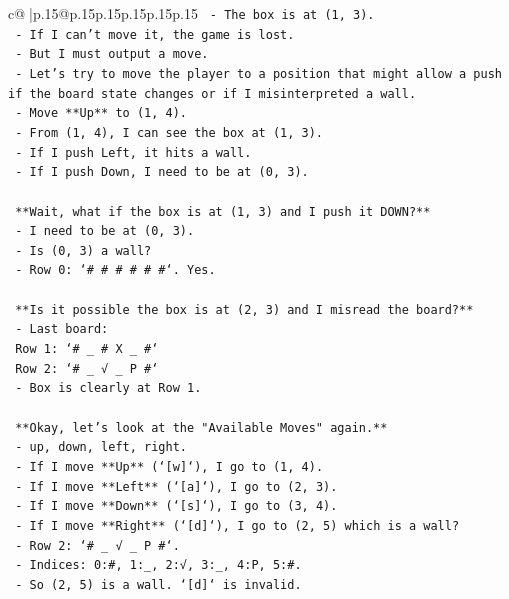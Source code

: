 \documentclass{article}
\begin{document}
{\begin{supertabular}{c@{$\;$}|p{.15\linewidth}@{}p{.15\linewidth}p{.15\linewidth}p{.15\linewidth}p{.15\linewidth}p{.15\linewidth}}
{{{\texttt{  {-} The box is at (1, 3).} \\
\texttt{  {-} If I can't move it, the game is lost.} \\
\texttt{  {-} But I must output a move.} \\
\texttt{  {-} Let's try to move the player to a position that might allow a push if the board state changes or if I misinterpreted a wall.} \\
\texttt{  {-} Move **Up** to (1, 4).} \\
\texttt{  {-} From (1, 4), I can see the box at (1, 3).} \\
\texttt{  {-} If I push Left, it hits a wall.} \\
\texttt{  {-} If I push Down, I need to be at (0, 3).} \\
\\ 
\texttt{  **Wait, what if the box is at (1, 3) and I push it DOWN?**} \\
\texttt{  {-} I need to be at (0, 3).} \\
\texttt{  {-} Is (0, 3) a wall?} \\
\texttt{  {-} Row 0: `\# \# \# \# \# \#`. Yes.} \\
\\ 
\texttt{  **Is it possible the box is at (2, 3) and I misread the board?**} \\
\texttt{  {-} Last board:} \\
\texttt{    Row 1: `\# \_ \# X \_ \#`} \\
\texttt{    Row 2: `\# \_ √ \_ P \#`} \\
\texttt{  {-} Box is clearly at Row 1.} \\
\\ 
\texttt{  **Okay, let's look at the "Available Moves" again.**} \\
\texttt{  {-} up, down, left, right.} \\
\texttt{  {-} If I move **Up** (`{[}w{]}`), I go to (1, 4).} \\
\texttt{  {-} If I move **Left** (`{[}a{]}`), I go to (2, 3).} \\
\texttt{  {-} If I move **Down** (`{[}s{]}`), I go to (3, 4).} \\
\texttt{  {-} If I move **Right** (`{[}d{]}`), I go to (2, 5) which is a wall?} \\
\texttt{    {-} Row 2: `\# \_ √ \_ P \#`.} \\
\texttt{    {-} Indices: 0:\#, 1:\_, 2:√, 3:\_, 4:P, 5:\#.} \\
\texttt{    {-} So (2, 5) is a wall. `{[}d{]}` is invalid.} \\
}}}
\end{supertabular}}
\end{document}
